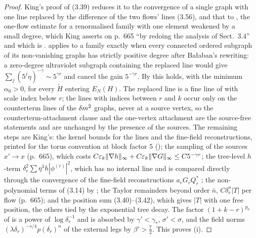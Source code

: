 \begin{proof}
King's proof of (3.39) \cite[pp.~660--662]{K1} reduces it to the convergence of a single graph with one line replaced by the difference of the two flows' lines (3.56), and that to \cite[Prop.~3.6]{K1}, the one-flow estimate for a renormalised family with one element weakened by a small degree, which King asserts on p.~665 ``by redoing the analysis of Sect.~3.4'' and which is .  applies to a family exactly when every connected ordered subgraph of its non-vanishing graphs has strictly positive degree after Ba{\l}aban's rewriting: a zero-degree ultraviolet subgraph containing the replaced line would give $\sum_j(5^j\eta)^{-\gamma}\sim5^{\gamma r}$ and cancel the gain $5^{-\gamma r}$. By  this holds, with the minimum $\alpha_0>0$, for every $\tilde H$ entering $E_N(H)$. The replaced line is a fine line of \cite[(3.17)]{K1} with scale index below $r$; the lines with indices between $r$ and $k$ occur only on the counterterm lines of the $\delta m^2$ graphs, never at a source vertex, so the counterterm-attachment clause \cite[(3.78)]{K1} and the one-vertex attachment are the source-free statements and are unchanged by the presence of the sources. The remaining steps are King's: the kernel bounds \cite[Thm.~3.3, Props.~3.7--3.9]{K1} for the lines and the fine-field reconstructions, printed for the torus convention at block factor $5$ (); the sampling of the sources $x'\to x$ (p.~665), which costs $C\varepsilon_k\|\nabla h\|_\infty+C\varepsilon_k\|\nabla G\|_\infty\le C5^{-\gamma r}$; the tree-level $h$-term $\delta_r^2\sum\eta^3h|\phi^{(r)}|^2$, which has no internal line and is compared directly through the convergence of the fine-field reconstructions $a_rG_rQ_r^*$ \cite[Thm.~3.3, \S3.6]{K1}; the non-polynomial terms of (3.14) by \cite[\S3.6, (3.89)--(3.98), Prop.~3.10]{K1}; the Taylor remainders beyond order $\bar n$, $C\delta_r^\sigma|T|$ per flow (p.~665); and the position sum (3.40)--(3.42), which gives $|T|$ with one free position, the others tied by the exponential tree decay. The factor $(1+k-r)^{p_0}$ of  is a power of $\log\delta_r^{-1}$ and is absorbed by $\gamma'<\gamma_*$, $\sigma'<\sigma$, and the field norms $(\lambda\delta_r)^{-s/4}p(\delta_r)^{n}$ of the external legs by $\beta'>\frac72$. This proves (i).


\end{proof}
